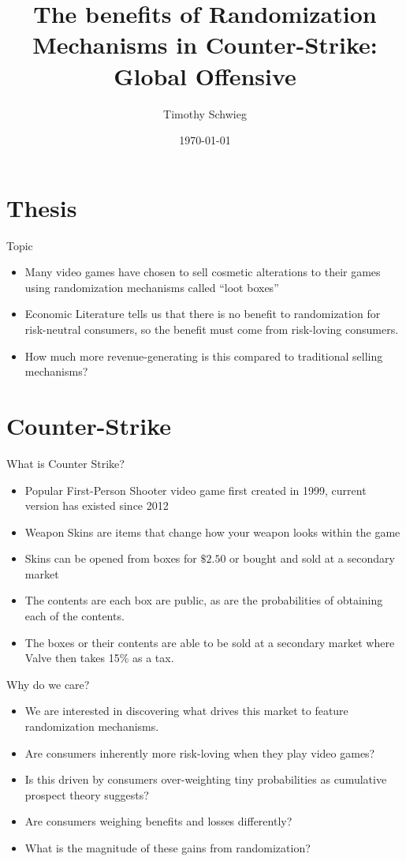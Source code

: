\documentclass[bigger]{beamer}
\author{Timothy Schwieg}
\date{\today}
\title{The benefits of Randomization Mechanisms in Counter-Strike: Global Offensive}
\begin{document}
\maketitle

\section{Thesis}
\label{sec:org92d0972}
\begin{frame}[label={sec:org6792b65}]{Topic}
\begin{itemize}
\item Many video games have chosen to sell cosmetic alterations to their
games using randomization mechanisms called ``loot boxes''
\item Economic Literature tells us that there is no benefit to
randomization for risk-neutral consumers, so the benefit must come
from risk-loving consumers.
\item How much more revenue-generating is this compared to traditional
selling mechanisms?
\end{itemize}
\end{frame}

\section{Counter-Strike}
\label{sec:org0597353}
\begin{frame}[label={sec:org27a13c0}]{What is Counter Strike?}
\begin{itemize}
\item Popular First-Person Shooter video game first created in 1999,
current version has existed since 2012
\item Weapon Skins are items that change how your weapon looks within the game
\item Skins can be opened from boxes for \(\$2.50\) or bought and sold at
a secondary market
\item The contents are each box are public, as are the probabilities of
obtaining each of the contents.
\item The boxes or their contents are able to be sold at a
secondary market where Valve then takes 15\% as a tax.
\end{itemize}
\end{frame}

\begin{frame}[label={sec:org5261429}]{Why do we care?}
\begin{itemize}
\item We are interested in discovering what drives this market to feature
randomization mechanisms.
\item Are consumers inherently more risk-loving when they play video
games?
\item Is this driven by consumers over-weighting tiny probabilities as
cumulative prospect theory suggests?
\item Are consumers weighing benefits and losses differently?
\item What is the magnitude of these gains from randomization?
\end{itemize}
\end{frame}
\end{document}
